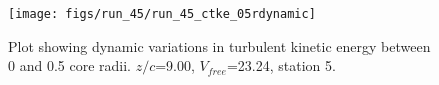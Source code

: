 \begin{figure}[H]
\centering
\texttt{[image: figs/run\_45/run\_45\_ctke\_05rdynamic]}
\caption{Plot showing dynamic variations in turbulent kinetic energy between 0 and 0.5 core radii. $z/c$=9.00, $V_{free}$=23.24, station 5.}
\label{fig:run_45_ctke_05rdynamic}
\end{figure}


